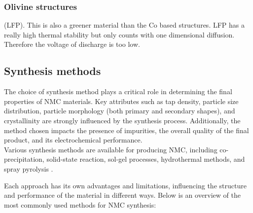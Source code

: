 \documentclass{article}
\begin{document}
{\begin{description}
  \subsubsection{Olivine structures}
  \item[$\text{LiFePO}_{4}$](LFP). This is also a greener material than the 
  Co based structures. LFP has a really high thermal stability but only counts
  with one dimensional diffusion. Therefore the voltage of discharge
  is too low.\cite{Olivine} \\
\end{description}

\subsection{Synthesis methods}

The choice of synthesis method plays a critical role in determining the final properties of NMC materials. Key attributes such as tap density, particle size distribution, particle morphology (both primary and secondary shapes), and crystallinity are strongly influenced by the synthesis process. Additionally, the method chosen impacts the presence of impurities, the overall quality of the final product, and its electrochemical performance. \\

Various synthesis methods are available for producing NMC, including co-precipitation, solid-state reaction, sol-gel processes, hydrothermal methods, and spray pyrolysis \cite{process}. 

Each approach has its own advantages and limitations, influencing the structure and performance of the material in different ways. Below is an overview of the most commonly used methods for NMC synthesis:
}
\end{document}

